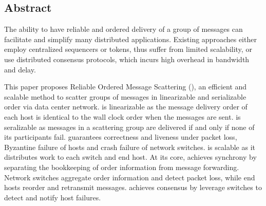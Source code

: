 \subsection*{Abstract}

The ability to have reliable and ordered delivery of a group of messages can facilitate and simplify many distributed applications.
Existing approaches either employ centralized sequencers or tokens, thus suffer from limited scalability, or use distributed consensus protocols, which incurs high overhead in bandwidth and delay.

This paper proposes Reliable Ordered Message Scattering (\sys), an efficient and scalable method to scatter groups of messages in linearizable and serializable order via data center network.
\sys is linearizable as the message delivery order of each host is identical to the wall clock order when the messages are sent.
\sys is seralizable as messages in a scattering group are delivered if and only if none of its participants fail.
\sys guarantees correctness and liveness under packet loss, Byzantine failure of hosts and crash failure of network switches.
\sys is scalable as it distributes work to each switch and end host.
At its core, \sys achieves synchrony by separating the bookkeeping of order information from message forwarding.
Network switches aggregate order information and detect packet loss, while end hosts reorder and retransmit messages.
\sys achieves consensus by leverage switches to detect and notify host failures.



